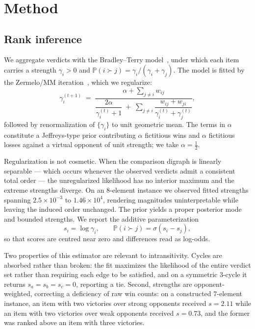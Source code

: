 \documentclass[11pt,a4paper]{article}
\newcommand{\Prob}{\mathbb{P}}
\begin{document}
\section{Method}
\label{sec:method}

\subsection{Rank inference}

We aggregate verdicts with the Bradley--Terry model~\cite{bradley1952}, under
which each item carries a strength $\gamma_i > 0$ and
$\Prob(i \succ j) = \gamma_i / (\gamma_i + \gamma_j)$. The model is fitted by the
Zermelo/MM iteration~\cite{zermelo1929,hunter2004}, which we regularize:
\begin{equation}
\gamma_i^{(t+1)} \;=\;
\frac{\alpha + \sum_{j \neq i} w_{ij}}
     {\dfrac{2\alpha}{\gamma_i^{(t)} + 1} \;+\;
      \sum_{j \neq i} \dfrac{w_{ij} + w_{ji}}{\gamma_i^{(t)} + \gamma_j^{(t)}}},
\label{eq:mm}
\end{equation}
followed by renormalization of $\{\gamma_i\}$ to unit geometric mean. The terms
in $\alpha$ constitute a Jeffreys-type prior contributing $\alpha$ fictitious
wins and $\alpha$ fictitious losses against a virtual opponent of unit strength;
we take $\alpha = \tfrac12$.

Regularization is not cosmetic. When the comparison digraph is linearly
separable --- which occurs whenever the observed verdicts admit a consistent
total order --- the unregularized likelihood has no interior maximum and the
extreme strengths diverge. On an $8$-element instance we observed fitted
strengths spanning $2.5\times10^{-3}$ to $1.46\times10^{4}$, rendering
magnitudes uninterpretable while leaving the induced order unchanged. The prior
yields a proper posterior mode and bounded strengths. We report the additive
parameterization
\begin{equation}
s_i = \log \gamma_i, \qquad \Prob(i \succ j) = \sigma(s_i - s_j),
\end{equation}
so that scores are centred near zero and differences read as log-odds.

Two properties of this estimator are relevant to intransitivity. Cycles are
absorbed rather than broken: the fit maximizes the likelihood of the entire
verdict set rather than requiring each edge to be satisfied, and on a symmetric
$3$-cycle it returns $s_a = s_b = s_c = 0$, reporting a tie. Second, strengths
are opponent-weighted, correcting a deficiency of raw win counts: on a
constructed $7$-element instance, an item with two victories over strong
opponents received $s = 2.11$ while an item with two victories over weak
opponents received $s = 0.73$, and the former was ranked above an item with
three victories.
\end{document}
